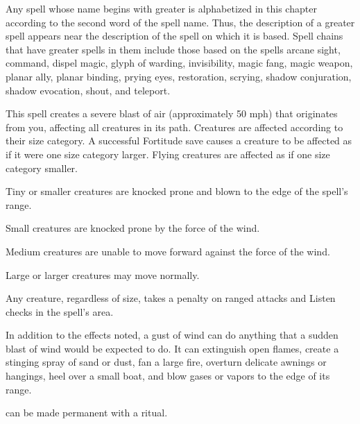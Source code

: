 \par Any spell whose name begins with greater is alphabetized in this chapter according to the second word of the spell name. Thus, the description of a greater spell appears near the description of the spell on which it is based. Spell chains that have greater spells in them include those based on the spells arcane sight, command, dispel magic, glyph of warding, invisibility, magic fang, magic weapon, planar ally, planar binding, prying eyes, restoration, scrying, shadow conjuration, shadow evocation, shout, and teleport.

\begin{spelleffect}
  This spell creates a severe blast of air (approximately 50 mph) that originates from you, affecting all creatures in its path. Creatures are affected according to their size category. A successful Fortitude save causes a creature to be affected as if it were one size category larger. Flying creatures are affected as if one size category smaller.
  \begin{itemize*}
    \item Tiny or smaller creatures are knocked prone and blown to the edge of the spell's range.
    \item Small creatures are knocked prone by the force of the wind.
    \item Medium creatures are unable to move forward against the force of the wind.
    \item Large or larger creatures may move normally.
  \end{itemize*}
  \par Any creature, regardless of size, takes a  penalty on ranged attacks and Listen checks in the spell's area.
  \par In addition to the effects noted, a gust of wind can do anything that a sudden blast of wind would be expected to do. It can extinguish open flames, create a stinging spray of sand or dust, fan a large fire, overturn delicate awnings or hangings, heel over a small boat, and blow gases or vapors to the edge of its range.
\end{spelleffect}
\begin{spellnotes}
   can be made permanent with a  ritual.
\end{spellnotes}

